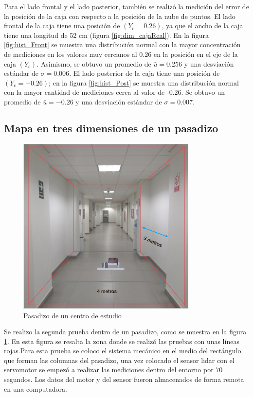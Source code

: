 Para el lado frontal y el lado posterior, también se realizó la medición del error de la
posición de la caja con respecto a la posición de la nube de puntos. El lado frontal de la
caja tiene una posición de $(Y_{c} = 0.26)$, ya que el ancho de la caja tiene una longitud
de 52 cm (figura \ref{fig:dim_cajaReal}). En la figura \ref{fig:hist_Front} se muestra una 
distribución normal con la mayor concentración de mediciones en los valores muy cercanos al 
0.26 en la posición en el eje de la caja $(Y_{c})$. Asimismo, se obtuvo un promedio de $\bar{u} 
= 0.256$ y una desviación estándar de $\sigma = 0.006$. El lado posterior de la caja tiene 
una posición de $(Y_{c} = -0.26)$; en la figura \ref{fig:hist_Post} se muestra una distribución
normal con la mayor cantidad de mediciones cerca al valor de -0.26. Se obtuvo un promedio de 
$\bar{u} = -0.26$ y una desviación estándar de $\sigma = 0.007$.

\subsection{Mapa en tres dimensiones de un pasadizo}
\begin{figure}
  \centering \footnotesize
  \includegraphics[width=0.80\textwidth]{images/esan_lidar.PNG}
  \captionsetup{font=footnotesize}
  \caption{Pasadizo de un centro de estudio}
  \label{fig:pasadizoEsan}
\end{figure}

Se realizo la segunda prueba dentro de un pasadizo, como se muestra en la figura 
\ref{fig:pasadizoEsan}. En esta figura se resalta la zona donde se realizó las pruebas 
con unas líneas rojas.Para esta prueba se coloco el sistema mecánico en el medio del 
rectángulo que forman las columnas del pasadizo, una vez colocado el sensor lidar con 
el servomotor se empezó a realizar las mediciones dentro del entorno por 70 segundos. Los 
datos del motor y del sensor fueron almacenados de forma remota en una computadora. 

